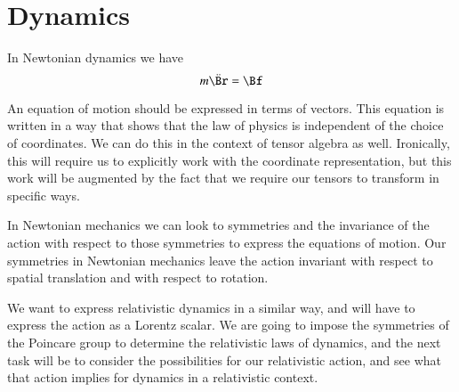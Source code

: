 %
%
\section{Dynamics}

In Newtonian dynamics we have
%
\begin{equation}\label{eqn:relativisticElectrodynamicsL6:250}
m \ddot{\Br} = \Bf
\end{equation}

An equation of motion should be expressed in terms of vectors.  This equation is written in a way that shows that the law of physics is independent of the choice of coordinates.  We can do this in the context of tensor algebra as well.  Ironically, this will require us to explicitly work with the coordinate representation, but this work will be augmented by the fact that we require our tensors to transform in specific ways.

In Newtonian mechanics we can look to symmetries and the invariance of the action with respect to those symmetries to express the equations of motion.  Our symmetries in Newtonian mechanics leave the action invariant with respect to spatial translation and with respect to rotation.

We want to express relativistic dynamics in a similar way, and will have to express the action as a Lorentz scalar.  We are going to impose the symmetries of the Poincare group to determine the relativistic laws of dynamics, and the next task will be to consider the possibilities for our relativistic action, and see what that action implies for dynamics in a relativistic context.
